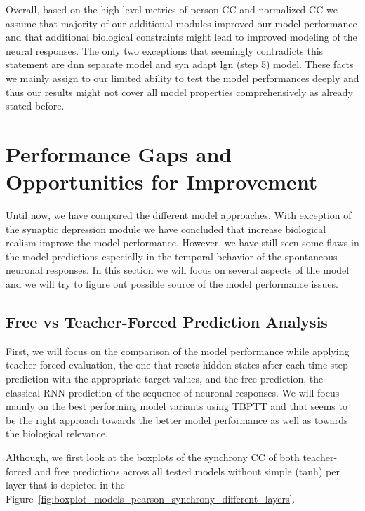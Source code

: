 Overall, based on the high level metrics of person CC and normalized CC we assume that majority of our additional modules improved our model performance and that additional biological constraints might lead to improved modeling of the neural responses. The only two exceptions that seemingly contradicts this statement are dnn separate model and syn adapt lgn (step 5) model. These facts we mainly assign to our limited ability to test the model performances deeply and thus our results might not cover all model properties comprehensively as already stated before.

\section{Performance Gaps and Opportunities for Improvement}
\label{sec:performace_gaps_and_opportunities_for_improvement}
Until now, we have compared the different model approaches. With exception of the synaptic depression module we have concluded that increase biological realism improve the model performance. However, we have still seen some flaws in the model predictions especially in the temporal behavior of the spontaneous neuronal responses. In this section we will focus on several aspects of the model and we will try to figure out possible source of the model performance issues.
\subsection{Free vs Teacher-Forced Prediction Analysis}
\label{{subsec:free_vs_teacher_forced_predictions}}
First, we will focus on the comparison of the model performance while applying teacher-forced evaluation, the one that resets hidden states after each time step prediction with the appropriate target values, and the free prediction, the classical RNN prediction of the sequence of neuronal responses. We will focus mainly on the best performing model variants using TBPTT and that seems to be the right approach towards the better model performance as well as towards the biological relevance. 

Although, we first look at the boxplots of the synchrony CC of both teacher-forced and free predictions across all tested models without simple (tanh) per layer that is depicted in the Figure~\ref{fig:boxplot_models_pearson_synchrony_different_layers}.


